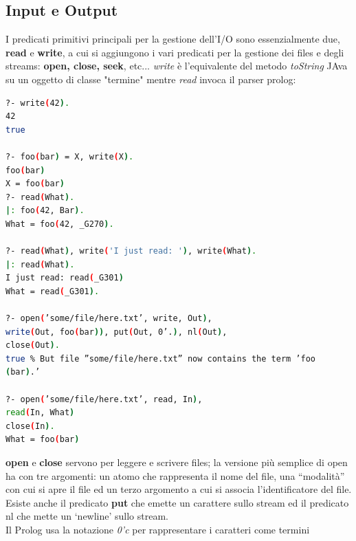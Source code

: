 \documentclass[a4paper,12pt, oneside]{book}
\begin{document}
\subsection{Input e Output}
I predicati primitivi principali per la gestione dell'I/O sono
essenzialmente due, \textbf{read} e \textbf{write}, a cui si aggiungono i vari predicati per la gestione dei files e degli streams: \textbf{open, close, seek}, etc...
\textit{write} è l'equivalente del metodo \textit{toString} JAva su un oggetto di classe "termine" mentre \textit{read} invoca il parser prolog:
\begin{shaded}
\begin{lstlisting}[language=bash]
?- write(42).
42
true

?- foo(bar) = X, write(X).
foo(bar)
X = foo(bar)
?- read(What).
|: foo(42, Bar).
What = foo(42, _G270).

?- read(What), write('I just read: '), write(What).
|: read(What).
I just read: read(_G301)
What = read(_G301).

?- open(’some/file/here.txt’, write, Out),
write(Out, foo(bar)), put(Out, 0’.), nl(Out),
close(Out).
true % But file ”some/file/here.txt” now contains the term ’foo
(bar).’

?- open(’some/file/here.txt’, read, In),
read(In, What)
close(In).
What = foo(bar)
\end{lstlisting}
\end{shaded}
\textbf{open} e \textbf{close} servono per leggere e scrivere files; la versione più semplice di open ha con tre argomenti: un atomo che rappresenta il nome del file, una “modalità” con cui si apre il file ed un terzo argomento a cui si associa l’identificatore del file.\\
Esiste anche il predicato \textbf{put} che emette un carattere sullo stream ed il predicato nl che mette un ‘newline’ sullo stream.\\
Il Prolog usa la notazione \textit{0'c} per rappresentare i caratteri come termini
\end{document}

